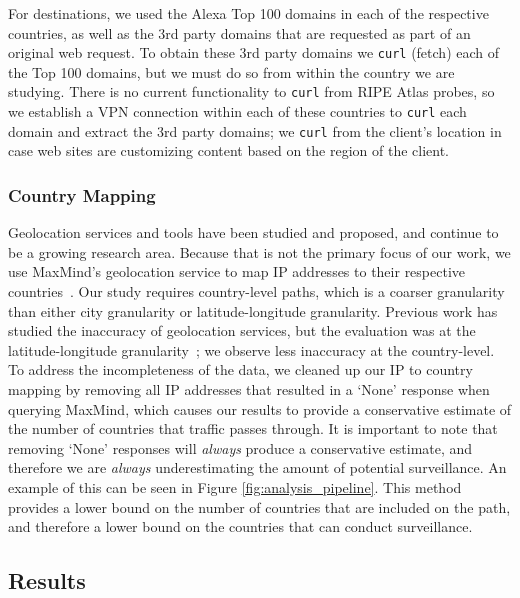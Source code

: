 For destinations, we used the Alexa Top 100 domains in each of the respective countries, as well as the 3rd party domains that are requested as part of an original web request.  To obtain these 3rd party domains we {\tt curl} (fetch) each of the Top 100 domains, but we must do so from within the country we are studying.  There is no current functionality to {\tt curl} from RIPE Atlas probes, so we establish a VPN connection within each of these countries to {\tt curl} each domain and extract the 3rd party domains; we {\tt curl} from the client's location in case web sites are customizing content based on the region of the client.

\subsubsection{Country Mapping}
\label{c_map}
Geolocation services and tools have been studied and proposed, and continue to be a growing research area.  Because that is not the primary focus of our work, we use MaxMind's geolocation service to map IP addresses to their respective countries~\cite{maxmind}.   Our study requires country-level paths, which is a coarser granularity than either city granularity or latitude-longitude granularity.  Previous work has studied the inaccuracy of geolocation services, but the evaluation was at the latitude-longitude granularity~\cite{huffaker2011geocompare}; we observe less inaccuracy at the country-level.  To address the incompleteness of the data, we cleaned up our IP to country mapping by removing all IP addresses that resulted in a `None' response when querying MaxMind, which causes our results to provide a conservative estimate of the number of countries that traffic passes through. It is important to note that removing `None' responses will \textit{always} produce a conservative estimate, and therefore we are \textit{always} underestimating the amount of potential surveillance.  An example of this can be seen in Figure \ref{fig:analysis_pipeline}.  This method provides a lower bound on the number of countries that are included on the path, and therefore a lower bound on the countries that can conduct surveillance.  

\subsection{Results}

